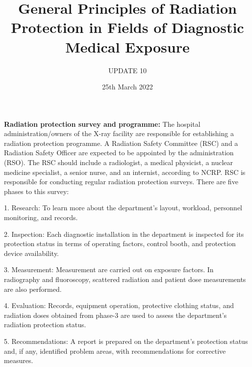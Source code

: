 \documentclass[12pt]{article}
\title{General Principles of Radiation Protection in Fields of Diagnostic Medical Exposure}
\author{UPDATE 10}
\date{25th March 2022}
\begin{document}
\maketitle

\textbf{Radiation protection survey and programme:}
The hospital administration/owners of the X-ray facility are responsible for establishing a radiation protection programme. A Radiation Safety Committee (RSC) and a Radiation Safety Officer are expected to be appointed by the administration (RSO). The RSC should include a radiologist, a medical physicist, a nuclear medicine specialist, a senior nurse, and an internist, according to NCRP. RSC is responsible for conducting regular radiation protection surveys. There are five phases to this survey:

\raggedright 1. Research: To learn more about the department's layout, workload, personnel monitoring, and records.

2. Inspection: Each diagnostic installation in the department is inspected for its protection status in terms of operating factors, control booth, and protection device availability.

3. Measurement: Measurement are carried out on exposure factors. In radiography and fluoroscopy, scattered radiation and patient dose measurements are also performed.

4. Evaluation: Records, equipment operation, protective clothing status, and radiation doses obtained from phase-3 are used to assess the department's radiation protection status.

5. Recommendations: A report is prepared on the department's protection status and, if any, identified problem areas, with recommendations for corrective measures.
\end{document}
